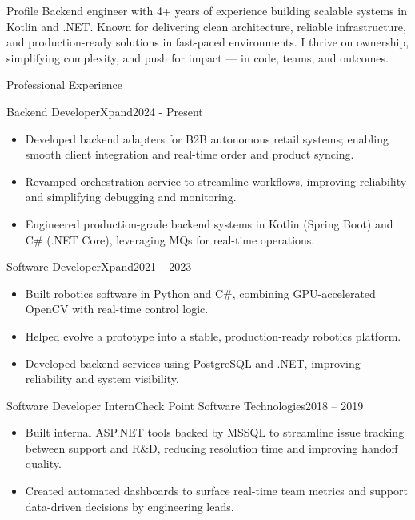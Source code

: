 \documentclass[]{mcdowellcv}
\begin{document}
	\makeheader
	
	\begin{cvsection}{Profile}
		Backend engineer with 4+ years of experience building scalable systems in Kotlin and .NET. Known for delivering clean architecture, reliable infrastructure, and production-ready solutions in fast-paced environments. I thrive on ownership, simplifying complexity, and push for impact — in code, teams, and outcomes.
	\end{cvsection}
	\begin{cvsection}{Professional Experience}
		\begin{cvsubsection}{Backend Developer}{Xpand}{2024 - Present}
			\begin{itemize}
				\item Developed backend adapters for B2B autonomous retail systems; enabling smooth client integration and \linebreak real-time order and product syncing.
				\item Revamped orchestration service to streamline workflows, improving reliability and simplifying debugging and monitoring.
				\item Engineered production-grade backend systems in Kotlin (Spring Boot) and C\# (.NET Core), leveraging MQs for real-time operations.
			\end{itemize}
		\end{cvsubsection}
		
		\begin{cvsubsection}{Software Developer}{Xpand}{2021 – 2023}
			\begin{itemize}
				\item Built robotics software in Python and C\#, combining GPU-accelerated OpenCV with real-time control logic.
				\item Helped evolve a prototype into a stable, production-ready robotics platform.
				\item Developed backend services using PostgreSQL and .NET, improving reliability and system visibility.
			\end{itemize}
		\end{cvsubsection}

		\begin{cvsubsection}{Software Developer Intern}{Check Point Software Technologies}{2018 – 2019}
			\begin{itemize}
			  \item Built internal ASP.NET tools backed by MSSQL to streamline issue tracking between support and R\&D, reducing resolution time and improving handoff quality.
			  \item Created automated dashboards to surface real-time team metrics and support data-driven decisions by \linebreak engineering leads.
			\end{itemize}
		  \end{cvsubsection}
		  
	\end{cvsection}
	
\end{document}
